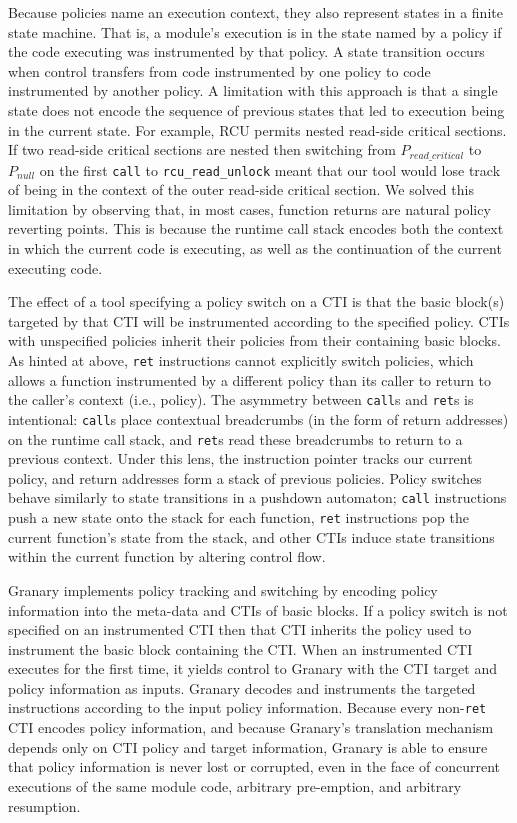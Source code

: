 \documentclass[preprint]{sigplanconf}
\begin{document}
Because policies name an execution context, they also represent states in a finite state machine. That is, a module's execution is in the state named by a policy if the code executing was instrumented by that policy. A state transition occurs when control transfers from code instrumented by one policy to code instrumented by another policy. A limitation with this approach is that a single state does not encode the sequence of previous states that led to execution being in the current state. For example, RCU permits nested read-side critical sections. If two read-side critical sections are nested then switching from $P_{\mathit{read\_critical}}$ to $P_{\mathit{null}}$ on the first \texttt{call} to \texttt{rcu\_read\_unlock} meant that our tool would lose track of being in the context of the outer read-side critical section. We solved this limitation by observing that, in most cases, function returns are natural policy reverting points. This is because the runtime call stack encodes both the context in which the current code is executing, as well as the continuation of the current executing code.

The effect of a tool specifying a policy switch on a CTI is that the basic block(s) targeted by that CTI will be instrumented according to the specified policy. CTIs with unspecified policies inherit their policies from their containing basic blocks. As hinted at above, \texttt{ret} instructions cannot explicitly switch policies, which allows a function instrumented by a different policy than its caller to return to the caller's context (i.e., policy). The asymmetry between \texttt{call}s and \texttt{ret}s is intentional: \texttt{call}s place contextual breadcrumbs (in the form of return addresses) on the runtime call stack, and \texttt{ret}s read these breadcrumbs to return to a previous context. Under this lens, the instruction pointer tracks our current policy, and return addresses form a stack of previous policies. Policy switches behave similarly to state transitions in a pushdown automaton; \texttt{call} instructions push a new state onto the stack for each function, \texttt{ret} instructions pop the current function's state from the stack, and other CTIs induce state transitions within the current function by altering control flow.

Granary implements policy tracking and switching by encoding policy information into the meta-data and CTIs of basic blocks. If a policy switch is not specified on an instrumented CTI then that CTI inherits the policy used to instrument the basic block containing the CTI. When an instrumented CTI executes for the first time, it yields control to Granary with the CTI target and policy information as inputs. Granary decodes and instruments the targeted instructions according to the input policy information. Because every non-\texttt{ret} CTI encodes policy information, and because Granary's translation mechanism depends only on CTI policy and target information, Granary is able to ensure that policy information is never lost or corrupted, even in the face of concurrent executions of the same module code, arbitrary pre-emption, and arbitrary resumption.
\end{document}
